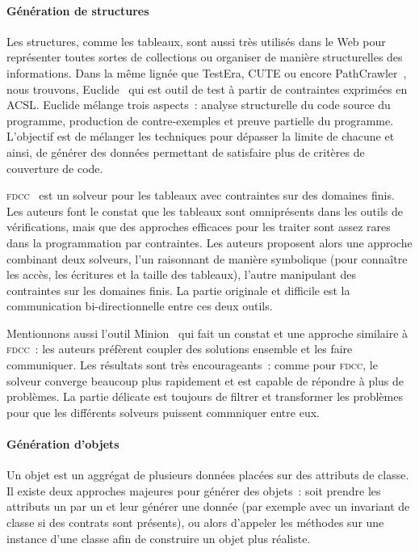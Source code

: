 \paragraph{Génération de structures} Les structures, comme les tableaux, sont
aussi très utilisés dans le Web pour représenter toutes sortes de collections ou
organiser de manière structurelles des informations. Dans la même lignée que
TestEra, CUTE ou encore PathCrawler~, nous trouvons,
Euclide~ qui est outil de test à partir de contraintes
exprimées en ACSL. Euclide mélange trois aspects~: analyse structurelle du code
source du programme, production de contre-exemples et preuve partielle du
programme. L'objectif est de mélanger les techniques pour dépasser la limite de
chacune et ainsi, de générer des données permettant de satisfaire plus de
critères de couverture de code.

{\scshape fdcc}~ est un solveur pour les tableaux avec
contraintes sur des domaines finis. Les auteurs font le constat que les tableaux
sont omniprésents dans les outils de vérifications, mais que des approches
efficaces pour les traiter sont assez rares dans la programmation par
contraintes. Les auteurs proposent alors une approche combinant deux solveurs,
l'un raisonnant de manière symbolique (pour connaître les accès, les écritures
et la taille des tableaux), l'autre manipulant des contraintes sur les domaines
finis. La partie originale et difficile est la communication bi-directionnelle
entre ces deux outils.

Mentionnons aussi l'outil Minion~ qui fait un constat et une
approche similaire à {\scshape fdcc}~: les auteurs préfèrent coupler des
solutions ensemble et les faire communiquer. Les résultats sont très
encourageants~: comme pour {\scshape fdcc}, le solveur converge beaucoup plus
rapidement et est capable de répondre à plus de problèmes. La partie délicate
est toujours de filtrer et transformer les problèmes pour que les différents
solveurs puissent commniquer entre eux.

\paragraph{Génération d'objets} Un objet est un aggrégat de plusieurs données
placées sur des attributs de classe.  Il existe deux approches majeures pour
générer des objets~: soit prendre les attributs un par un et leur générer une
donnée (par exemple avec un invariant de classe si des contrats sont présents),
ou alors d'appeler les méthodes sur une instance d'une classe afin de construire
un objet plus réaliste.

